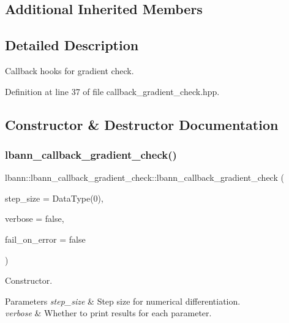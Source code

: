 \subsection*{Additional Inherited Members}


\subsection{Detailed Description}
Callback hooks for gradient check. 

Definition at line 37 of file callback\+\_\+gradient\+\_\+check.\+hpp.



\subsection{Constructor \& Destructor Documentation}
\mbox{\label{classlbann_1_1lbann__callback__gradient__check_ae198159c613bb05e00f49b824a61afbb}} 
\subsubsection{\texorpdfstring{lbann\+\_\+callback\+\_\+gradient\+\_\+check()}{lbann\_callback\_gradient\_check()}\hspace{0.1cm}{\footnotesize\ttfamily [1/2]}}
{\footnotesize\ttfamily lbann\+::lbann\+\_\+callback\+\_\+gradient\+\_\+check\+::lbann\+\_\+callback\+\_\+gradient\+\_\+check (\begin{DoxyParamCaption}\item[{Data\+Type}]{step\+\_\+size = {\ttfamily DataType(0)},  }\item[{bool}]{verbose = {\ttfamily false},  }\item[{bool}]{fail\+\_\+on\+\_\+error = {\ttfamily false} }\end{DoxyParamCaption})}

Constructor. 
\begin{DoxyParams}{Parameters}
{\em step\+\_\+size} & Step size for numerical differentiation. \\
\hline
{\em verbose} & Whether to print results for each parameter. \\
\hline
\end{DoxyParams}



